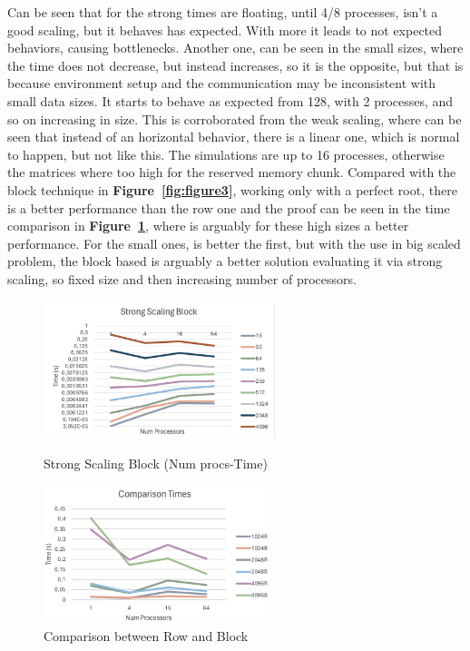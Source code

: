 Can be seen that for the strong times are floating, until 4/8 processes, isn't a good scaling, but it behaves has expected. With more it leads to not expected behaviors, causing bottlenecks. Another one, can be seen in the small sizes, where the time does not decrease, but instead increases, so it is the opposite, but that is because environment setup and the communication may be inconsistent with small data sizes. It starts to behave as expected from 128, with 2 processes, and so on increasing in size. This is corroborated from the weak scaling, where can be seen that instead of an horizontal behavior, there is a linear one, which is normal to happen, but not like this. The simulations are up to 16 processes, otherwise the matrices where too high for the reserved memory chunk. Compared with the block technique in \textbf{Figure~\ref{fig:figure3}}, working only with a perfect root, there is a better performance than the row one and the proof can be seen in the time comparison in \textbf{Figure~\ref{fig:figure4}}, where is arguably for these high sizes a better performance.
For the small ones, is better the first, but with the use in big scaled problem, the block based is arguably a better solution evaluating it via strong scaling, so fixed size and then increasing number of processors. 
\begin{figure}[h!]
    \centering
    \begin{minipage}[b]{1.0\columnwidth}
        \centering
        \includegraphics[width=\textwidth,height=4cm,keepaspectratio=false]{images/1.01 Strong Scaling Block.png}
        \caption{Strong Scaling Block (Num procs-Time)}
        \label{fig:figure3}
    \end{minipage}
    \hfill
    \begin{minipage}[b]{1.0\columnwidth}
        \centering
        \includegraphics[width=\textwidth,height=4cm,keepaspectratio=false]{images/1.04 Time Comparison.png}
        \caption{Comparison between Row and Block}
        \label{fig:figure4}
    \end{minipage}
\end{figure}
